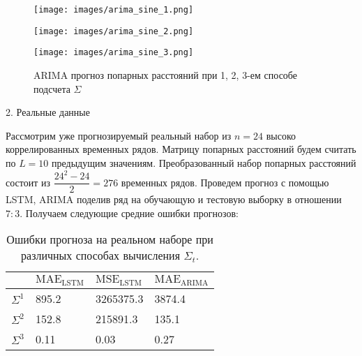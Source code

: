 \documentclass{article}
\begin{document}
\begin{figure}[h]
  \begin{minipage}{0.33\textwidth}
    \centering
    \texttt{[image: images/arima\_sine\_1.png]}
  \end{minipage}\hfill
  \begin{minipage}{0.33\textwidth}
    \centering
    \texttt{[image: images/arima\_sine\_2.png]}
  \end{minipage}
  \begin{minipage}{0.33\textwidth}
    \centering
    \texttt{[image: images/arima\_sine\_3.png]}
  \end{minipage}\hfill
      \caption{ARIMA прогноз попарных расстояний при 1, 2, 3-ем способе подсчета $\Sigma$}
\end{figure}

\begin{comment}
    \begin{figure}[h]
  \centering
  \begin{minipage}{0.5\textwidth}
    \centering
    \texttt{[image: images/4\_sine\_corr\_for\_3.png]}
    \caption{LSTM прогноз попарных расстояний при 3-ом способе подсчета $\Sigma$}
  \end{minipage}\hfill
\end{figure}
\end{comment}


2. Реальные данные 

Рассмотрим уже прогнозируемый реальный набор из $n = 24$ высоко коррелированных временных рядов. Матрицу попарных расстояний будем считать по $L = 10$ предыдущим значениям. Преобразованный набор попарных расстояний состоит из $\dfrac{24^2 - 24}{2} = 276$ временных рядов. Проведем прогноз с помощью LSTM, ARIMA поделив ряд на обучающую и тестовую выборку в отношении $7 : 3$. Получаем следующие средние ошибки прогнозов:

\begin{table}[h]
\centering
\begin{tabular}{|l|l|l|l|}
\hline  
         & $\text{MAE}_{\text{LSTM}}$  & $\text{MSE}_{\text{LSTM}}$  & $\text{MAE}_{\text{ARIMA}}$\\ \hline
${\Sigma}^1$ & 895.2 & 3265375.3 & 3874.4 \\ \hline
${\Sigma}^2$ & 152.8 & 215891.3 & 135.1 \\ \hline
${\Sigma}^3$ & 0.11 & 0.03 & 0.27 \\ \hline
\end{tabular}
\caption{Ошибки прогноза на реальном наборе при различных способах вычисления $\Sigma_t$.}
\label{tab:stat}
\end{table}
\end{document}
